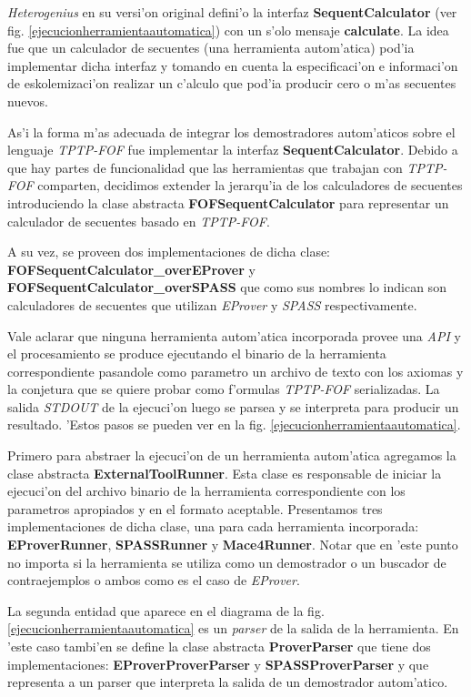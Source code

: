 \textit{Heterogenius} en su versi'on original defini'o la interfaz \textbf{SequentCalculator} (ver fig. \ref{ejecucionherramientaautomatica}) con un s'olo mensaje \textbf{calculate}. La idea fue que un calculador de secuentes (una herramienta autom'atica) pod'ia implementar dicha interfaz y tomando en cuenta la especificaci'on e informaci'on de eskolemizaci'on realizar un c'alculo que pod'ia producir cero o m'as secuentes nuevos.

As'i la forma m'as adecuada de integrar los demostradores autom'aticos sobre el lenguaje \textit{TPTP-FOF} fue implementar la interfaz \textbf{SequentCalculator}. Debido a que hay partes de funcionalidad que las herramientas que trabajan con \textit{TPTP-FOF} comparten, decidimos extender la jerarqu'ia de los calculadores de secuentes introduciendo la clase abstracta \textbf{FOFSequentCalculator} para representar un calculador de secuentes basado en \textit{TPTP-FOF}.

A su vez, se proveen dos implementaciones de dicha clase: \textbf{FOFSequentCalculator\_overEProver} y \textbf{FOFSequentCalculator\_overSPASS} que como sus nombres lo indican son calculadores de secuentes que utilizan \textit{EProver} y \textit{SPASS} respectivamente.

Vale aclarar que ninguna herramienta autom'atica incorporada provee una \textit{API} y el procesamiento se produce ejecutando el binario de la herramienta correspondiente pasandole como parametro un archivo de texto con los axiomas y la conjetura que se quiere probar como f'ormulas \textit{TPTP-FOF} serializadas. La salida \textit{STDOUT} de la ejecuci'on luego se parsea y se interpreta para producir un resultado. 'Estos pasos se pueden ver en la fig. \ref{ejecucionherramientaautomatica}.

Primero para abstraer la ejecuci'on de un herramienta autom'atica agregamos la clase abstracta \textbf{ExternalToolRunner}. Esta clase es responsable de iniciar la ejecuci'on del archivo binario de la herramienta correspondiente con los parametros apropiados y en el formato aceptable. Presentamos tres implementaciones de dicha clase, una para cada herramienta incorporada: \textbf{EProverRunner}, \textbf{SPASSRunner} y \textbf{Mace4Runner}. Notar que en 'este punto no importa si la herramienta se utiliza como un demostrador o un buscador de contraejemplos o ambos como es el caso de \textit{EProver}.

La segunda entidad que aparece en el diagrama de la fig. \ref{ejecucionherramientaautomatica} es un \textit{parser} de la salida de la herramienta. En 'este caso tambi'en se define la clase abstracta \textbf{ProverParser} que tiene dos implementaciones: \textbf{EProverProverParser} y \textbf{SPASSProverParser} y que representa a un parser que interpreta la salida de un demostrador autom'atico.


